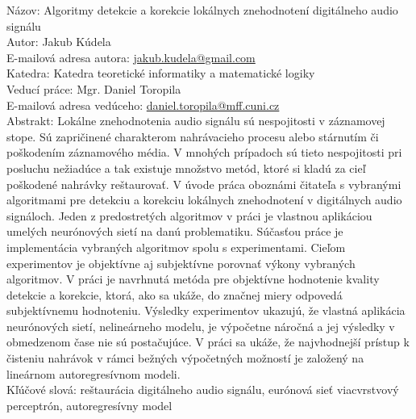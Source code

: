 
\noindent
Názov: Algoritmy detekcie a korekcie lokálnych znehodnotení digitálneho audio signálu\\
Autor: Jakub Kúdela\\
E-mailová adresa autora: \url{jakub.kudela@gmail.com}\\
Katedra: Katedra teoretické informatiky a matematické logiky\\
Veducí práce: Mgr. Daniel Toropila\\
E-mailová adresa vedúceho: \url{daniel.toropila@mff.cuni.cz}\\

\noindent
Abstrakt: Lokálne znehodnotenia audio signálu sú nespojitosti v záznamovej stope. Sú zapričinené charakterom nahrávacieho procesu alebo stárnutím či poškodením záznamového média. V mnohých prípadoch sú tieto nespojitosti pri posluchu nežiadúce a tak existuje množstvo metód, ktoré si kladú za cieľ poškodené nahrávky reštaurovať. V úvode práca oboznámi čitateľa s vybranými algoritmami pre detekciu a korekciu lokálnych znehodnotení v digitálnych audio signáloch. Jeden z predostretých algoritmov v práci je vlastnou aplikáciou umelých neurónových sietí na danú problematiku. Súčasťou práce je implementácia vybraných algoritmov spolu s experimentami. Cieľom experimentov je objektívne aj subjektívne porovnať výkony vybraných algoritmov. V práci je navrhnutá metóda pre objektívne hodnotenie kvality detekcie a korekcie, ktorá, ako sa ukáže, do značnej miery odpovedá subjektívnemu hodnoteniu. Výsledky experimentov ukazujú, že vlastná aplikácia neurónových sietí, nelineárneho modelu, je výpočetne náročná a jej výsledky v obmedzenom čase nie sú postačujúce. V práci sa ukáže, že najvhodnejší prístup k čisteniu nahrávok v rámci bežných výpočetných možností je založený na lineárnom autoregresívnom modeli.\\

\noindent
Kľúčové slová: reštaurácia digitálneho audio signálu, eurónová sieť viacvrstvový perceptrón, autoregresívny model
